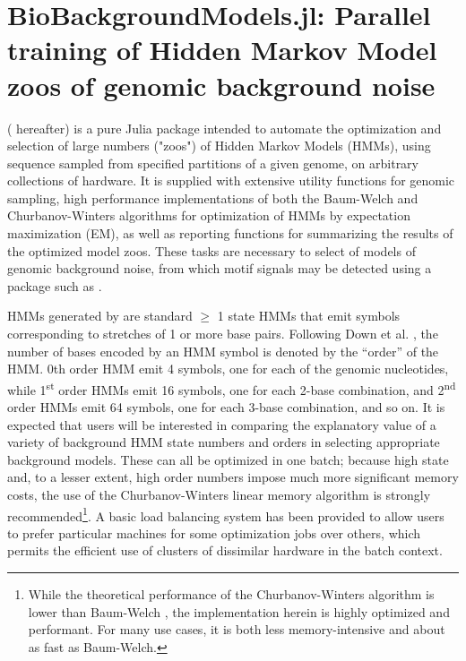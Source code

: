 \chapter{BioBackgroundModels.jl: Parallel training of Hidden Markov Model zoos of genomic background noise}
\label{chap:BBM}

 ( hereafter) is a pure Julia package intended to automate the optimization and selection of large numbers ("zoos") of Hidden Markov Models (HMMs), using sequence sampled from specified partitions of a given genome, on arbitrary collections of hardware. It is supplied with extensive utility functions for genomic sampling, high performance implementations of both the Baum-Welch and Churbanov-Winters algorithms for optimization of HMMs by expectation maximization (EM), as well as reporting functions for summarizing the results of the optimized model zoos. These tasks are necessary to select of models of genomic background noise, from which motif signals may be detected using a package such as .

HMMs generated by  are standard $\geq$ 1 state HMMs that emit symbols corresponding to stretches of 1 or more base pairs. Following Down et al. \cite{Down2005}, the number of bases encoded by an HMM symbol is denoted by the ``order'' of the HMM. 0th order HMM emit 4 symbols, one for each of the genomic nucleotides, while 1\textsuperscript{st} order HMMs emit 16 symbols, one for each 2-base combination, and 2\textsuperscript{nd} order HMMs emit 64 symbols, one for each 3-base combination, and so on. It is expected that users will be interested in comparing the explanatory value of a variety of background HMM state numbers and orders in selecting appropriate background models. These can all be optimized in one batch; because high state and, to a lesser extent, high order numbers impose much more significant memory costs, the use of the Churbanov-Winters linear memory algorithm is strongly recommended\footnote{While the theoretical performance of the Churbanov-Winters algorithm is lower than Baum-Welch \cite{Churbanov2008}, the implementation herein is highly optimized and performant. For many use cases, it is both less memory-intensive and about as fast as Baum-Welch.}. A basic load balancing system has been provided to allow users to prefer particular machines for some optimization jobs over others, which permits the efficient use of clusters of dissimilar hardware in the batch context.

